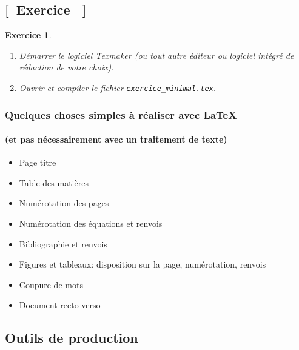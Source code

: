 \documentclass[aspectratio=54,10pt,xcolor=x11names]{beamer}
\newcommand{\fichier}[1]{\texttt{#1}}
\theoremstyle{example}
\newtheorem{exercice}[theorem]{Exercice}
\newcounter{exerciceref}
\begin{document}
\subsection{[~Exercice \theexerciceref~]}

\begin{frame}[plain,fragile=singleslide]
  \begin{exercice}
    \begin{enumerate}
    \item Démarrer le logiciel Texmaker (ou tout autre
      éditeur ou logiciel intégré de rédaction de votre choix).
    \item Ouvrir et compiler le fichier \fichier{exercice\_minimal.tex}.
    \end{enumerate}
  \end{exercice}
\end{frame}


\begin{frame}
  \frametitle{Quelques choses simples à réaliser avec {\LaTeX}}
  \framesubtitle{(et pas nécessairement avec un traitement de texte)}
  \begin{itemize}
  \item Page titre
  \item Table des matières
  \item Numérotation des pages
  \item Numérotation des équations et renvois
  \item Bibliographie et renvois
  \item Figures et tableaux: disposition sur la page, numérotation, renvois
  \item Coupure de mots
  \item Document recto-verso
  \end{itemize}
\end{frame}

\subsection{Outils de production}
\end{document}
